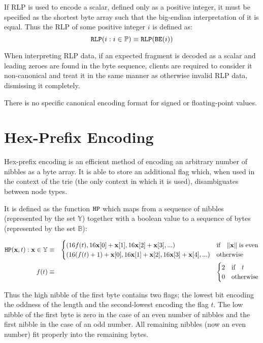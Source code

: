 \documentclass[9pt,oneside]{amsart}
\begin{document}
If RLP is used to encode a scalar, defined only as a positive integer, it must be specified as the shortest byte array such that the big-endian interpretation of it is equal. Thus the RLP of some positive integer $i$ is defined as:
\begin{equation}
\mathtt{\tiny RLP}(i : i \in \mathbb{P}) \equiv \mathtt{\tiny RLP}(\mathtt{\tiny BE}(i))
\end{equation}

When interpreting RLP data, if an expected fragment is decoded as a scalar and leading zeroes are found in the byte sequence, clients are required to consider it non-canonical and treat it in the same manner as otherwise invalid RLP data, dismissing it completely.

There is no specific canonical encoding format for signed or floating-point values.

\section{Hex-Prefix Encoding}\label{app:hexprefix}
Hex-prefix encoding is an efficient method of encoding an arbitrary number of nibbles as a byte array. It is able to store an additional flag which, when used in the context of the trie (the only context in which it is used), disambiguates between node types.

It is defined as the function $\mathtt{\tiny HP}$ which maps from a sequence of nibbles (represented by the set $\mathbb{Y}$) together with a boolean value to a sequence of bytes (represented by the set $\mathbb{B}$):

\begin{eqnarray}
\mathtt{\tiny HP}(\mathbf{x}, t): \mathbf{x} \in \mathbb{Y} & \equiv & \begin{cases}
(16f(t), 16\mathbf{x}[0] + \mathbf{x}[1], 16\mathbf{x}[2] + \mathbf{x}[3], ...) &
\text{if} \quad \lVert \mathbf{x} \rVert \; \text{is even} \\
(16(f(t) + 1) + \mathbf{x}[0], 16\mathbf{x}[1] + \mathbf{x}[2], 16\mathbf{x}[3] + \mathbf{x}[4], ...) &
\text{otherwise}
\end{cases} \\
f(t) & \equiv & \begin{cases} 2 & \text{if} \quad t \\ 0 & \text{otherwise} \end{cases}
\end{eqnarray}

Thus the high nibble of the first byte contains two flags; the lowest bit encoding the oddness of the length and the second-lowest encoding the flag $t$. The low nibble of the first byte is zero in the case of an even number of nibbles and the first nibble in the case of an odd number. All remaining nibbles (now an even number) fit properly into the remaining bytes.
\end{document}
